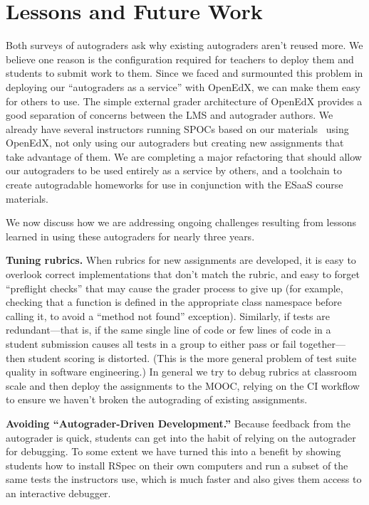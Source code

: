 \section{Lessons and Future Work}

Both  surveys of autograders ask why existing autograders aren't reused more.
We believe one reason is the configuration required for teachers to deploy them and
students to submit work to them.  Since we
faced and surmounted this problem in deploying our ``autograders as a
service'' with OpenEdX, we can make them easy for others to use.
The simple external grader architecture of OpenEdX provides a good separation
of concerns between the LMS and autograder authors.
We already have several instructors running SPOCs based on our
materials~\cite{moocs-spocs-TR} using OpenEdX, not only using our
autograders but creating new assignments that take advantage of them.
We are completing a major refactoring that should allow our autograders
to be used entirely as a service by others, and a toolchain to create
autogradable homeworks for use in conjunction with the ESaaS course
materials. 

We now discuss how we are addressing ongoing
challenges resulting from lessons learned in using these autograders for
nearly three years.

\textbf{Tuning rubrics.}
When rubrics for new assignments are developed, it is easy to overlook
correct implementations that don't match the rubric, and easy to forget
``preflight checks'' that may cause the grader process to give up (for
example, checking that a function is defined in the appropriate class
namespace before calling it, to avoid a ``method not found''
exception).  Similarly, if tests are
redundant---that is, if the same single line of code or few lines of
code in a student submission causes all tests in a group to either pass
or fail together---then student scoring is distorted.  (This is the more
general problem of test suite quality in software engineering.)
In general we try to debug rubrics at classroom scale and
then deploy the assignments to the MOOC, relying on the CI workflow to
ensure we haven't broken the autograding of existing assignments.

\textbf{Avoiding ``Autograder-Driven Development.''}
Because feedback from the autograder is quick, students can get into the
habit of relying on the autograder for debugging.  To some extent we
have turned this into a benefit by showing students how to install RSpec
on their own computers and run a subset of the same tests the
instructors use, which is much faster and also gives them access to an
interactive debugger.

